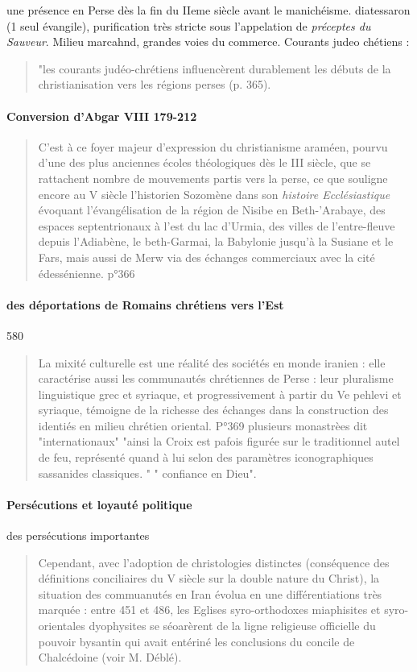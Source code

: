 une présence en Perse dès la fin du IIeme siècle avant le manichéisme. 
diatessaron (1 seul évangile), purification très stricte sous l'appelation de \textit{préceptes du Sauveur}. 
Milieu marcahnd, grandes voies du commerce. 
Courants judeo chétiens : 
\begin{quote}
"les courants judéo-chrétiens influencèrent durablement les débuts de la christianisation vers les régions perses (p. 365).
\end{quote}

\paragraph{Conversion d'Abgar VIII 179-212}
\begin{quote}
    C'est à ce foyer majeur d'expression du christianisme araméen, pourvu d'une des plus anciennes écoles théologiques dès le III siècle, que se rattachent nombre de mouvements partis vers la perse, ce que souligne encore au V siècle l'historien Sozomène dans son \textit{histoire Ecclésiastique} évoquant l'évangélisation de la région de Nisibe en Beth-'Arabaye, des espaces septentrionaux à l'est du lac d'Urmia, des villes de l'entre-fleuve depuis l'Adiabène, le beth-Garmai, la Babylonie jusqu'à la Susiane et le Fars, mais aussi de Merw via des échanges commerciaux avec la cité édessénienne. p°366
\end{quote}

\paragraph{des déportations de Romains chrétiens vers l'Est } 580

\begin{quote}
    La mixité culturelle est une réalité des sociétés en monde iranien : elle caractérise aussi les communautés chrétiennes de Perse : leur pluralisme linguistique grec et syriaque, et progressivement à partir du Ve pehlevi et syriaque, témoigne de la richesse des échanges dans la construction des identiés en milieu chrétien oriental. P°369
    plusieurs monastrèes dit "internationaux"
    "ainsi la Croix est pafois figurée sur le traditionnel autel de feu, représenté quand à lui selon des paramètres iconographiques sassanides classiques. "
    " confiance en Dieu".
\end{quote}
\paragraph{Persécutions et loyauté politique}
des persécutions importantes
\begin{quote}
    Cependant, avec l'adoption de christologies distinctes (conséquence des définitions conciliaires du V siècle sur la double nature du Christ), la situation des commuanutés en Iran évolua en une différentiations très marquée : entre 451 et 486, les Eglises syro-orthodoxes miaphisites et syro-orientales dyophysites se séoarèrent de la ligne religieuse officielle du pouvoir bysantin qui avait entériné les conclusions du concile de Chalcédoine (voir M. Déblé). 
\end{quote}

